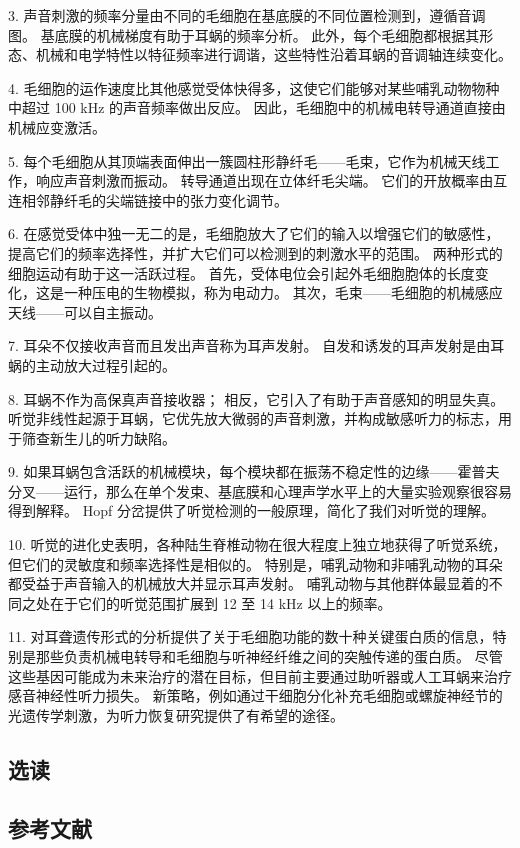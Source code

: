 3. 声音刺激的频率分量由不同的毛细胞在基底膜的不同位置检测到，遵循音调图。 基底膜的机械梯度有助于耳蜗的频率分析。 此外，每个毛细胞都根据其形态、机械和电学特性以特征频率进行调谐，这些特性沿着耳蜗的音调轴连续变化。 

4. 毛细胞的运作速度比其他感觉受体快得多，这使它们能够对某些哺乳动物物种中超过 100 kHz 的声音频率做出反应。 因此，毛细胞中的机械电转导通道直接由机械应变激活。 

5. 每个毛细胞从其顶端表面伸出一簇圆柱形静纤毛——毛束，它作为机械天线工作，响应声音刺激而振动。 转导通道出现在立体纤毛尖端。 它们的开放概率由互连相邻静纤毛的尖端链接中的张力变化调节。 

6. 在感觉受体中独一无二的是，毛细胞放大了它们的输入以增强它们的敏感性，提高它们的频率选择性，并扩大它们可以检测到的刺激水平的范围。 两种形式的细胞运动有助于这一活跃过程。 首先，受体电位会引起外毛细胞胞体的长度变化，这是一种压电的生物模拟，称为电动力。 其次，毛束——毛细胞的机械感应天线——可以自主振动。 

7. 耳朵不仅接收声音而且发出声音称为耳声发射。 自发和诱发的耳声发射是由耳蜗的主动放大过程引起的。 

8. 耳蜗不作为高保真声音接收器； 相反，它引入了有助于声音感知的明显失真。 听觉非线性起源于耳蜗，它优先放大微弱的声音刺激，并构成敏感听力的标志，用于筛查新生儿的听力缺陷。 

9. 如果耳蜗包含活跃的机械模块，每个模块都在振荡不稳定性的边缘——霍普夫分叉——运行，那么在单个发束、基底膜和心理声学水平上的大量实验观察很容易得到解释。 Hopf 分岔提供了听觉检测的一般原理，简化了我们对听觉的理解。 

10. 听觉的进化史表明，各种陆生脊椎动物在很大程度上独立地获得了听觉系统，但它们的灵敏度和频率选择性是相似的。 特别是，哺乳动物和非哺乳动物的耳朵都受益于声音输入的机械放大并显示耳声发射。 哺乳动物与其他群体最显着的不同之处在于它们的听觉范围扩展到 12 至 14 kHz 以上的频率。 

11. 对耳聋遗传形式的分析提供了关于毛细胞功能的数十种关键蛋白质的信息，特别是那些负责机械电转导和毛细胞与听神经纤维之间的突触传递的蛋白质。 尽管这些基因可能成为未来治疗的潜在目标，但目前主要通过助听器或人工耳蜗来治疗感音神经性听力损失。 新策略，例如通过干细胞分化补充毛细胞或螺旋神经节的光遗传学刺激，为听力恢复研究提供了有希望的途径。

\subsection{选读}
\subsection{参考文献}